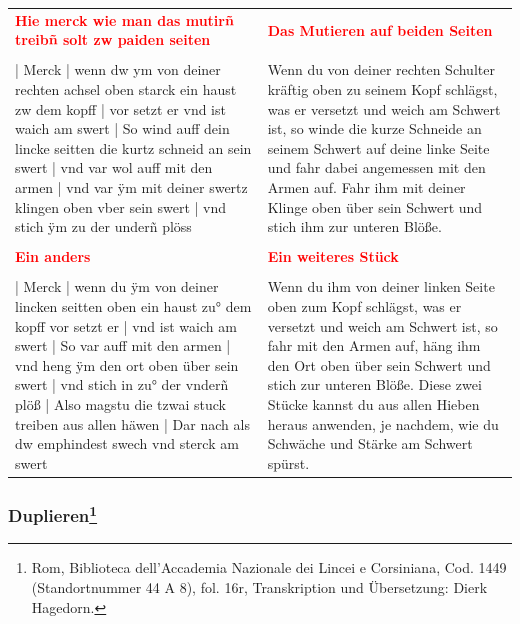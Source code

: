 \begin{longtable}{p{6.25cm}p{6.25cm}}
\textbf{\textcolor{red}{Hie merck wie man das mutirñ treibñ solt zw paiden seiten}}
&
\textbf{\textcolor{red}{Das Mutieren auf beiden Seiten}}
\\
\\
| Merck | wenn dw ym von deiner rechten achsel oben starck ein haust zw dem kopff | vor setzt er vnd ist waich am swert | So wind auff dein lincke seitten die kurtz schneid an sein swert | vnd var wol auff mit den armen | vnd var ÿm mit deiner swertz klingen oben vber sein swert | vnd stich ÿm zu der underñ plöss
&
Wenn du von deiner rechten Schulter kräftig oben zu seinem Kopf schlägst, was er versetzt und weich am Schwert ist, so winde die kurze Schneide an seinem Schwert auf deine linke Seite und fahr dabei angemessen mit den Armen auf. Fahr ihm mit deiner Klinge oben über sein Schwert und stich ihm zur unteren Blöße.
\\
\\
\textbf{\textcolor{red}{Ein anders}}
&
\textbf{\textcolor{red}{Ein weiteres Stück}}
\\
\\
| Merck | wenn du ÿm von deiner lincken seitten oben ein haust zu° dem kopff vor setzt er | vnd ist waich am swert  | So var auff mit den armen | vnd heng ÿm den ort oben über sein swert | vnd stich in zu° der vnderñ plöß | Also magstu die tzwai stuck treiben aus allen häwen | Dar nach als dw emphindest swech vnd sterck am swert
&
Wenn du ihm von deiner linken Seite oben zum Kopf schlägst, was er versetzt und weich am Schwert ist, so fahr mit den Armen auf, häng ihm den Ort oben über sein Schwert und stich zur unteren Blöße.
Diese zwei Stücke kannst du aus allen Hieben heraus anwenden, je nachdem, wie du Schwäche und Stärke am Schwert spürst.
\end{longtable}

\newpage

\begin{center}
\end{center}

\newpage

\subsubsection[Duplieren]{Duplieren\footnote{\hspace*{0.5ex}Rom, Biblioteca dell'Accademia Nazionale dei Lincei e Corsiniana, Cod. 1449 (Standortnummer 44 A 8), fol. 16r, Transkription und Übersetzung: Dierk Hagedorn.}}


